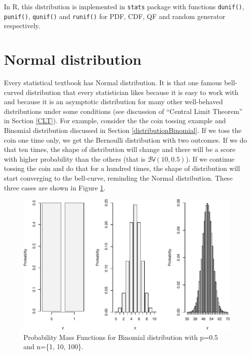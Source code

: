 \documentclass[
]{book}
\theoremstyle{definition}
\theoremstyle{definition}
\theoremstyle{definition}
\theoremstyle{definition}
\theoremstyle{remark}
\begin{document}
In R, this distribution is implemented in \texttt{stats} package with functions \texttt{dunif()}, \texttt{punif()}, \texttt{qunif()} and \texttt{runif()} for PDF, CDF, QF and random generator respectively.

\hypertarget{distributionsNormal}{%
\section{Normal distribution}\label{distributionsNormal}}

Every statistical textbook has Normal distribution. It is that one famous bell-curved distribution that every statistician likes because it is easy to work with and because it is an asymptotic distribution for many other well-behaved distributions under some conditions (see discussion of ``Central Limit Theorem'' in Section \ref{CLT}). For example, consider the the coin tossing example and Binomial distribution discussed in Section \ref{distributionBinomial}. If we toss the coin one time only, we get the Bernoulli distribution with two outcomes. If we do that ten times, the shape of distribution will change and there will be a score with higher probability than the others (that is \(\mathcal{Bi}(10, 0.5)\)). If we continue tossing the coin and do that for a hundred times, the shape of distribution will start converging to the bell-curve, reminding the Normal distribution. These three cases are shown in Figure \ref{fig:binomialPMFSeveral}.

\begin{figure}
\centering
\includegraphics{Svetunkov---Statistics-for-Business-Analytics_files/figure-latex/binomialPMFSeveral-1.pdf}
\caption{\label{fig:binomialPMFSeveral}Probability Mass Functions for Binomial distribution with p=0.5 and n=\{1, 10, 100\}.}
\end{figure}
\end{document}
